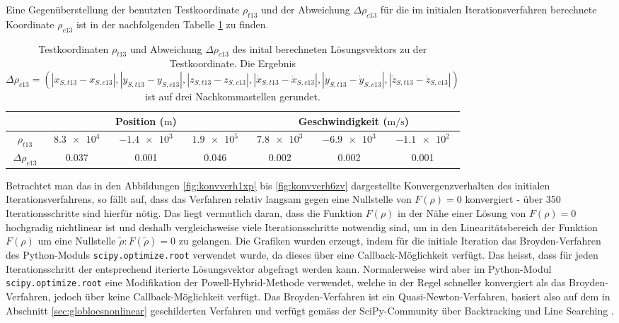 \documentclass[a4paper,12pt]{article}
\numberwithin{equation}{section}
\begin{document}
Eine Gegenüberstellung der benutzten Testkoordinate $\rho_{t13}$ und der Abweichung $\Delta \rho_{c13}$ für die im initialen Iterationsverfahren berechnete Koordinate $\rho_{c13}$ ist in der nachfolgenden Tabelle \ref{tab:testconfig6} zu finden.

\begin{table}[ht]
\renewcommand{\arraystretch}{1.1}
\centering
\begin{tabular}{|c|c|c|c|c|c|c|}
\cline{2-7}
\multicolumn{1}{c|}{} & \multicolumn{3}{c|}{Position ($\si{\meter}$)} & \multicolumn{3}{c|}{Geschwindigkeit ($\si{\meter\per\second}$)} \\
\cline{2-7}\hline
$\rho_{t13}$ & $\num{8.3e4}$ & $\num{-1.4e3}$ & $\num{1.9e5}$ & $\num{7.8e3} $ & $\num{-6.9e3}$ & $\num{-1.1e2}$ \\
$\Delta \rho_{c13}$ & 0.037 & 0.001 & 0.046 & 0.002 & 0.002 & 0.001 \\
\hline
\end{tabular}
\caption{Testkoordinaten $\rho_{t13}$ und Abweichung $\Delta \rho_{c13}$ des inital berechneten Lösungsvektors zu der Testkoordinate. Die Ergebnis $\Delta \rho_{c13}=(|x_{S,t13}-x_{S,c13}|,|y_{S,t13}-y_{S,c13}|,|z_{S,t13}-z_{S,c13}|,|\dot{x}_{S,t13}-\dot{x}_{S,c13}|,|\dot{y}_{S,t13}-\dot{y}_{S,c13}|,|\dot{z}_{S,t13}-\dot{z}_{S,c13}|)$ ist auf drei Nachkommastellen gerundet.}
\label{tab:testconfig6}
\end{table}

Betrachtet man das in den Abbildungen \ref{fig:konvverh1xp} bis \ref{fig:konvverh6zv} dargestellte Konvergenzverhalten des initialen Iterationsverfahrens, so fällt auf, dass das Verfahren relativ langsam gegen eine Nullstelle von $F(\rho)
= 0$ konvergiert - über 350 Iterationsschritte sind hierfür nötig. Das liegt vermutlich daran, dass die Funktion $F(\rho)$ in der Nähe einer Lösung von $F(\rho) = 0$ hochgradig nichtlinear ist und deshalb vergleichsweise viele Iterationsschritte notwendig sind, um in den Linearitätsbereich der Funktion $F(\rho)$ um eine Nullstelle $\tilde{\rho}: F(\tilde{\rho}) = 0$ zu gelangen. Die Grafiken wurden erzeugt, indem für die initiale Iteration das Broyden-Verfahren des Python-Moduls \verb|scipy.optimize.root| verwendet wurde, da dieses über eine Callback-Möglichkeit verfügt. Das heisst, dass für jeden Iterationsschritt der entsprechend iterierte Lösungsvektor abgefragt werden kann. Normalerweise wird aber im Python-Modul \verb|scipy.optimize.root| eine Modifikation der Powell-Hybrid-Methode verwendet, welche in der Regel schneller konvergiert als das Broyden-Verfahren, jedoch über keine Callback-Möglichkeit verfügt. Das Broyden-Verfahren ist ein Quasi-Newton-Verfahren, basiert also auf dem in Abschnitt \ref{sec:globloesnonlinear} geschilderten Verfahren und verfügt gemäss der SciPy-Community über Backtracking und Line Searching \cite{SciPyDoc.20.05.2022}.
\end{document}
